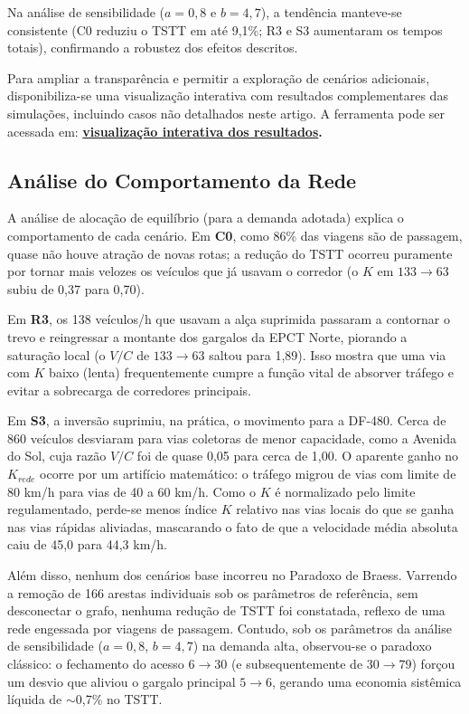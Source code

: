 \documentclass[portuguese]{sbc2025}%
\begin{document}
Na análise de sensibilidade ($a=0{,}8$ e $b=4{,}7$), a tendência manteve-se consistente (C0 reduziu o TSTT em até 9,1\%; R3 e S3 aumentaram os tempos totais), confirmando a robustez dos efeitos descritos. 

Para ampliar a transparência e permitir a exploração de cenários adicionais, disponibiliza-se uma visualização interativa com resultados complementares das simulações, incluindo casos não detalhados neste artigo. A ferramenta pode ser acessada em: \textbf{\href{https://redondave.github.io/Projeto-LimpaRuas/resultados/painel.html}{visualização interativa dos resultados}.}

\subsection{Análise do Comportamento da Rede}
A análise de alocação de equilíbrio (para a demanda adotada) explica o comportamento de cada cenário. Em \textbf{C0}, como 86\% das viagens são de passagem, quase não houve atração de novas rotas; a redução do TSTT ocorreu puramente por tornar mais velozes os veículos que já usavam o corredor (o $K$ em $133\rightarrow63$ subiu de 0,37 para 0,70). 

Em \textbf{R3}, os 138 veículos/h que usavam a alça suprimida passaram a contornar o trevo e reingressar a montante dos gargalos da EPCT Norte, piorando a saturação local (o $V/C$ de $133\rightarrow63$ saltou para 1,89). Isso mostra que uma via com $K$ baixo (lenta) frequentemente cumpre a função vital de absorver tráfego e evitar a sobrecarga de corredores principais.

Em \textbf{S3}, a inversão suprimiu, na prática, o movimento para a DF-480. Cerca de 860 veículos desviaram para vias coletoras de menor capacidade, como a Avenida do Sol, cuja razão $V/C$ foi de quase 0,05 para cerca de 1,00. O aparente ganho no $K_{rede}$ ocorre por um artifício matemático: o tráfego migrou de vias com limite de 80 km/h para vias de 40 a 60 km/h. Como o $K$ é normalizado pelo limite regulamentado, perde-se menos índice $K$ relativo nas vias locais do que se ganha nas vias rápidas aliviadas, mascarando o fato de que a velocidade média absoluta caiu de 45,0 para 44,3 km/h.

Além disso, nenhum dos cenários base incorreu no Paradoxo de Braess. Varrendo a remoção de 166 arestas individuais sob os parâmetros de referência, sem desconectar o grafo, nenhuma redução de TSTT foi constatada, reflexo de uma rede engessada por viagens de passagem. Contudo, sob os parâmetros da análise de sensibilidade ($a=0{,}8$, $b=4{,}7$) na demanda alta, observou-se o paradoxo clássico: o fechamento do acesso $6\rightarrow30$ (e subsequentemente de $30\rightarrow79$) forçou um desvio que aliviou o gargalo principal $5\rightarrow6$, gerando uma economia sistêmica líquida de $\sim$0,7\% no TSTT.
\end{document}
